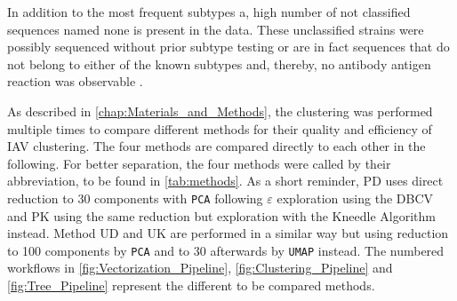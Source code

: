 
In addition to the most frequent subtypes a, high number of not classified sequences named \glqq none\grqq{} is present in the data. These unclassified strains were possibly sequenced without prior subtype testing or are in fact sequences that do not belong to either of the known subtypes and, thereby, no antibody antigen reaction was observable \autocite{noauthor_revision_1980}.

\vspace{1em}

As described in \autoref{chap:Materials_and_Methods}, the clustering was performed multiple times to compare different methods for their quality and efficiency of \gls{IAV} clustering. The four methods are compared directly to each other in the following. For better separation, the four methods were called by their abbreviation, to be found in \autoref{tab:methods}. As a short reminder, PD uses direct reduction to 30 components with \texttt{PCA} following $\varepsilon$ exploration using the \gls{DBCV} and PK using the same reduction but exploration with the Kneedle Algorithm instead. Method UD and UK are performed in a similar way but using reduction to 100 components by \texttt{PCA} and to 30 afterwards by \texttt{UMAP} instead. The numbered workflows in \autoref{fig:Vectorization_Pipeline}, \autoref{fig:Clustering_Pipeline} and \autoref{fig:Tree_Pipeline} represent the different to be compared methods.

